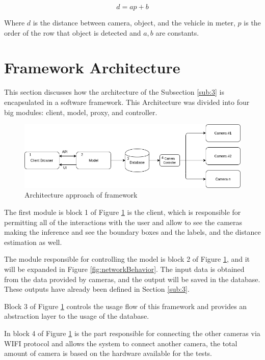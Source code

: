 \begin{equation}
    \label{eq:eq4}
    d = ap+b
\end{equation}

Where $d$ is the distance between camera, object, and the vehicle in meter, $p$ is the order of the row that object is detected and $a, b$ are constants.

 
\section{Framework Architecture} \label{framework}

This section discusses how the architecture of the Subsection \ref{sub:3} is encapsulated in a software framework. This Architecture was divided into four big modules: client, model, proxy, and controller. 



\begin{figure}[H]
\centering
\includegraphics[scale=0.6]{imagens/diagram.png}
\caption{Architecture approach of framework}
\label{fig:framework}
\end{figure}

The first module is block 1 of Figure \ref{fig:framework} is the client, which is responsible for permitting all of the interactions with the user and allow to see the cameras making the inference and see the boundary boxes and the labels, and the distance estimation as well.

The module responsible for controlling the model is block 2 of Figure \ref{fig:framework}, and it will be expanded in Figure \ref{fig:networkBehavior}. The input data is obtained from the data provided by cameras, and the output will be saved in the database. These outputs have already been defined in Section \ref{sub:3}. 

Block 3 of Figure \ref{fig:framework} controls the usage flow of this framework and provides an abstraction layer to the usage of the database. 

In block 4 of Figure \ref{fig:framework} is the part responsible for connecting the other cameras via WIFI protocol and allows the system to connect another camera, the total amount of camera is based on the hardware available for the tests. 


